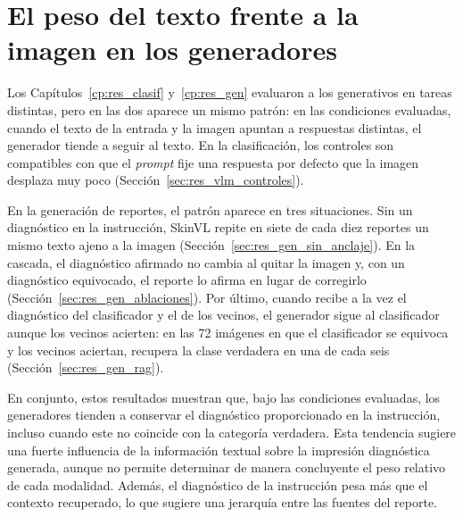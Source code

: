 \section{El peso del texto frente a la imagen en los generadores}
\label{sec:disc_texto_imagen}

Los Capítulos~\ref{cp:res_clasif} y~\ref{cp:res_gen} evaluaron a los generativos en tareas distintas, pero en las dos
aparece un mismo patrón: en las condiciones evaluadas, cuando el texto de la entrada y la imagen apuntan a respuestas distintas, el generador tiende a seguir al texto. En la clasificación, los controles son compatibles con que el \emph{prompt} fije una respuesta por defecto que la
imagen desplaza muy poco
(Sección~\ref{sec:res_vlm_controles}).

En la generación de reportes, el patrón aparece en tres situaciones. Sin un diagnóstico en la instrucción, SkinVL repite en siete de cada diez reportes un mismo texto ajeno a la imagen (Sección~\ref{sec:res_gen_sin_anclaje}). En la cascada, el diagnóstico afirmado no cambia al quitar la imagen y, con un
diagnóstico equivocado, el reporte lo afirma en lugar de corregirlo (Sección~\ref{sec:res_gen_ablaciones}). Por
último, cuando recibe a la vez el diagnóstico del clasificador y el de los vecinos, el generador sigue al clasificador
aunque los vecinos acierten: en las 72 imágenes en que el clasificador se equivoca y los vecinos aciertan, recupera la clase verdadera en una de cada seis
(Sección~\ref{sec:res_gen_rag}).

En conjunto, estos resultados muestran que, bajo las condiciones evaluadas, los generadores tienden a conservar el diagnóstico proporcionado en la instrucción, incluso cuando este no coincide con la categoría verdadera. Esta tendencia sugiere una fuerte influencia de la información textual sobre la impresión diagnóstica generada, aunque no permite determinar de manera concluyente el peso relativo de cada modalidad. Además, el diagnóstico de la instrucción pesa más que el contexto recuperado, lo que sugiere una jerarquía entre las fuentes del reporte.

